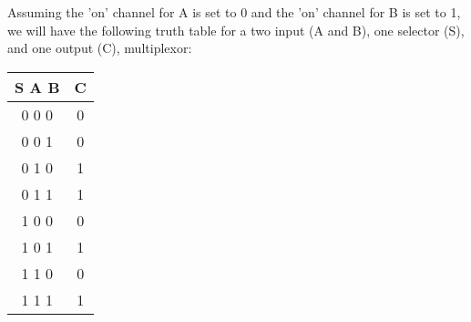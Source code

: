 \documentclass[12pt]{article}
\begin{document}
	\begin{center}
		Assuming the 'on' channel for A is set to 0 and the 'on' channel for B is set to 1, we will have the following truth table for a two input (A and B), one selector (S), and one output (C), multiplexor:  \vspace{0.75cm} \\
		
		\begin{tabular} { |c|c| }
			\hline
			S A B & C \\
			\hline
			0 0 0 & 0 \\
			\hline
			0 0 1 & 0 \\
			\hline
			0 1 0 & 1 \\
			\hline
			0 1 1 & 1 \\
			\hline
			1 0 0 & 0 \\
			\hline
			1 0 1 & 1 \\
			\hline
			1 1 0 & 0 \\
			\hline
			1 1 1 & 1 \\
			\hline
		\end{tabular}
	\end{center}
	
\end{document}
